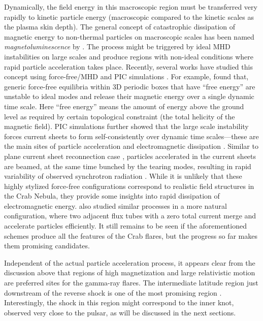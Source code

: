 Dynamically, the field energy in this macroscopic region must be transferred very rapidly to kinetic particle energy (macroscopic compared to the kinetic scales as the plasma skin depth). The general concept of catastrophic dissipation of magnetic energy to non-thermal particles on macroscopic scales has been named \textit{magnetoluminescence} by \citet{Blandford_2014}. The process might be triggered by ideal MHD instabilities on large scales and produce regions with non-ideal conditions where rapid particle acceleration takes place. Recently, several works have studied this concept using force-free/MHD \citep{East_2015,2016arXiv160305731L,Zrake_2016} and PIC simulations \citep{2016arXiv160305731L,2016arXiv160403179Y,Nalewajko_2016}. For example, \citet{East_2015} found that, generic force-free equilibria within 3D periodic boxes that have ``free energy'' are unstable to ideal modes and release their magnetic energy over a single dynamic time scale. Here ``free energy'' means the amount of energy above the ground level as required by certain topological constraint (the total helicity of the magnetic field). PIC simulations further showed that the large scale instability forces current sheets to form self-consistently over dynamic time scales---these are the main sites of particle acceleration and electromagnetic dissipation \citep{2016arXiv160305731L,Nalewajko_2016,Yuan_2016}. Similar to plane current sheet reconnection case \citep[e.g.][]{Cerutti_2013,Cerutti_2014}, particles accelerated in the current sheets are beamed, at the same time bunched by the tearing modes, resulting in rapid variability of observed synchrotron radiation \citep{Yuan_2016}. While it is unlikely that these highly stylized force-free configurations correspond to realistic field structures in the Crab Nebula, they provide some insights into rapid dissipation of electromagnetic energy. \citet{2016arXiv160305731L} also studied similar processes in a more natural configuration, where two adjacent flux tubes with a zero total current merge and accelerate particles efficiently. It still remains to be seen if the aforementioned schemes produce all the features of the Crab flares, but the progress so far makes them promising candidates.

Independent of the actual particle acceleration process, it appears clear from the discussion above that regions of high magnetization and large relativistic motion are preferred sites for the gamma-ray flares. The intermediate latitude region just downstream of the reverse shock is one of the most promising region \citet{2016arXiv160305731L}. Interestingly, the shock in this region might correspond to the inner knot, observed very close to the pulsar, as will be discussed in the next sections. 